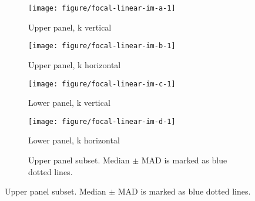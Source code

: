\documentclass[10pt,fleqn]{article}\usepackage[]{graphicx}\usepackage[]{color}
\makeatletter
\def\maxwidth{ %
  \ifdim\Gin@nat@width>\linewidth
    \linewidth
  \else
    \Gin@nat@width
  \fi
}
\newenvironment{knitrout}{}{} %
\makeatother
\begin{document}
\begin{figure}[!ht]
\caption{The image is convolved with a linear kernel $(-1, 2, -1)$}
%
\begin{subfigure}[b]{0.24\textwidth}
\caption{Upper panel, k vertical}
\begin{knitrout}\footnotesize
{}\color{fgcolor}

{\centering \texttt{[image: figure/focal-linear-im-a-1]} 

}



\end{knitrout}
\end{subfigure}
%
\begin{subfigure}[b]{0.24\textwidth}
\caption{Upper panel, k horizontal}
\begin{knitrout}\footnotesize
{}\color{fgcolor}

{\centering \texttt{[image: figure/focal-linear-im-b-1]} 

}



\end{knitrout}
\end{subfigure}
%
\begin{subfigure}[b]{0.24\textwidth}
\caption{Lower panel, k vertical}
\begin{knitrout}\footnotesize
{}\color{fgcolor}

{\centering \texttt{[image: figure/focal-linear-im-c-1]} 

}



\end{knitrout}
\end{subfigure}
%
\begin{subfigure}[b]{0.24\textwidth}
\caption{Lower panel, k horizontal}
\begin{knitrout}\footnotesize
{}\color{fgcolor}

{\centering \texttt{[image: figure/focal-linear-im-d-1]} 

}



\end{knitrout}
\end{subfigure}
%
%
\begin{subfigure}[b]{0.49\textwidth}
\caption{Upper panel subset. Median $\pm$ MAD is marked as blue dotted lines.}
\begin{knitrout}\footnotesize
{}\color{fgcolor}


\end{knitrout}
\end{subfigure}
\end{figure}
\end{document}
